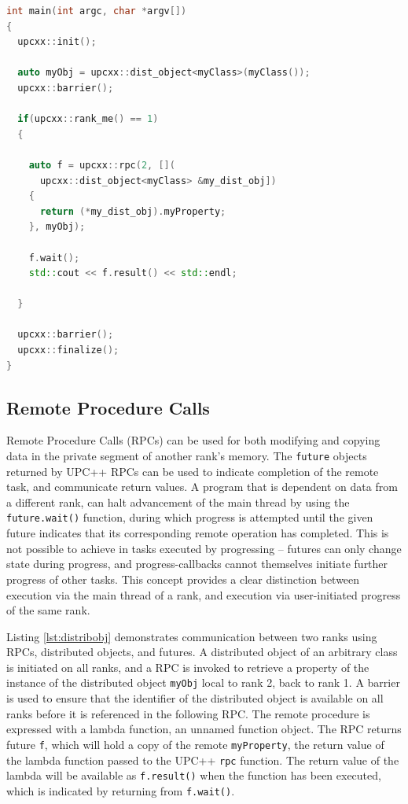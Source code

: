 \documentclass{uit-report}
\begin{document}
\begin{lstlisting}[label={lst:distribobj}, float=t,frame=tlrb, caption={Communication through RPC, referencing a distributed object of an arbitrary C++ class. Rank 1 retrieves and prints \emph{myProperty} from rank 2's instance of \emph{myObj}.}, captionpos=b, language=c++, showstringspaces=false]
int main(int argc, char *argv[])
{
  upcxx::init();

  auto myObj = upcxx::dist_object<myClass>(myClass());
  upcxx::barrier();

  if(upcxx::rank_me() == 1)
  {
  
    auto f = upcxx::rpc(2, [](
      upcxx::dist_object<myClass> &my_dist_obj])
    {
      return (*my_dist_obj).myProperty;
    }, myObj);

    f.wait();
    std::cout << f.result() << std::endl;
    
  }

  upcxx::barrier();
  upcxx::finalize();
} 
\end{lstlisting}

\subsection{Remote Procedure Calls}

Remote Procedure Calls (RPCs) can be used for both modifying and copying data in the private segment of another rank's memory. The \texttt{future} objects returned by UPC++ RPCs can be used to indicate completion of the remote task, and communicate return values. A program that is dependent on data from a different rank, can halt advancement of the main thread by using the \texttt{future.wait()} function, during which progress is attempted until the given future indicates that its corresponding remote operation has completed. This is not possible to achieve in tasks executed by progressing -- futures can only change state during progress, and progress-callbacks cannot themselves initiate further progress of other tasks. This concept provides a clear distinction between execution via the main thread of a rank, and execution via user-initiated progress of the same rank.

Listing \ref{lst:distribobj} demonstrates communication between two ranks using RPCs, distributed objects, and futures. A distributed object of an arbitrary class is initiated on all ranks, and a RPC is invoked to retrieve a property of the instance of the distributed object \texttt{myObj} local to rank 2, back to rank 1. A barrier is used to ensure that the identifier of the distributed object is available on all ranks before it is referenced in the following RPC. The remote procedure is expressed with a lambda function, an unnamed function object. The RPC returns future \texttt{f}, which will hold a copy of the remote \texttt{myProperty}, the return value of the lambda function passed to the UPC++ \texttt{rpc} function. The return value of the lambda will be available as \texttt{f.result()} when the function has been executed, which is indicated by returning from \texttt{f.wait()}. 
\end{document}
